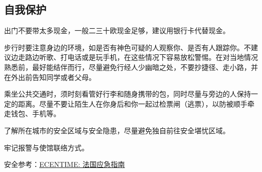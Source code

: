 \subsection{自我保护}
出门不要带太多现金，一般二三十欧现金足够，建议用银行卡代替现金。

步行时要注意身边的环境，如是否有神色可疑的人观察你、是否有人跟踪你。不建议边走路边听歌、打电话或是玩手机，在这些情况下容易放松警惕。在对当地情况熟悉前，最好能结伴而行，尽量避免行经人少幽暗之处，不要抄捷径、走小路，并在外出前告知同学或者父母。

乘坐公共交通时，须时刻看管好行李和随身携带的包，同时尽量与旁边的人保持一定的距离。尽量不要让陌生人在你身后和你一起过检票闸（逃票），以防被顺手牵走钱包、手机等。

了解所在城市的安全区域与安全隐患，尽量避免独自前往安全堪忧区域。

牢记报警与使馆联络方式。

安全参考：\href{https://www.ecentime.com/article/GuideUrgenceFrance}{ECENTIME: 法国应急指南}
